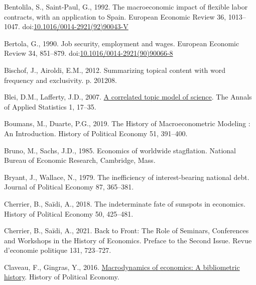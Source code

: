 \documentclass[
  12pt,
  onecolumn]{article}
\newlength{\cslhangindent}
\newlength{\cslentryspacingunit} %
\newenvironment{CSLReferences}[2] %
 {%
  \setlength{\parindent}{0pt}
  \ifodd #1
  \let\oldpar\par
  \def\par{\hangindent=\cslhangindent\oldpar}
  \fi
  \setlength{\parskip}{#2\cslentryspacingunit}
 }%
 {}
\begin{document}
\begin{CSLReferences}{1}{0}
\leavevmode{}%
Bentolila, S., Saint-Paul, G., 1992. The macroeconomic impact of
flexible labor contracts, with an application to {Spain}. European
Economic Review 36, 1013--1047.
doi:\href{https://doi.org/10.1016/0014-2921(92)90043-V}{10.1016/0014-2921(92)90043-V}

\leavevmode{}%
Bertola, G., 1990. Job security, employment and wages. European Economic
Review 34, 851--879.
doi:\href{https://doi.org/10.1016/0014-2921(90)90066-8}{10.1016/0014-2921(90)90066-8}

\leavevmode{}%
Bischof, J., Airoldi, E.M., 2012. Summarizing topical content with word
frequency and exclusivity. p. 201208.

\leavevmode{}%
Blei, D.M., Lafferty, J.D., 2007.
\href{https://www.jstor.org/stable/4537420}{A correlated topic model of
science}. The Annals of Applied Statistics 1, 17--35.

\leavevmode{}%
Boumans, M., Duarte, P.G., 2019. The {History} of {Macroeconometric
Modeling} : {An Introduction}. History of Political Economy 51,
391--400.

\leavevmode{}%
Bruno, M., Sachs, J.D., 1985. Economics of worldwide stagflation.
{National Bureau of Economic Research}, {Cambridge, Mass.}

\leavevmode{}%
Bryant, J., Wallace, N., 1979. The inefficiency of interest-bearing
national debt. Journal of Political Economy 87, 365--381.

\leavevmode{}%
Cherrier, B., Saïdi, A., 2018. The indeterminate fate of sunspots in
economics. History of Political Economy 50, 425--481.

\leavevmode{}%
Cherrier, B., Saïdi, A., 2021. Back to {Front}: {The Role} of
{Seminars}, {Conferences} and {Workshops} in the {History} of
{Economics}. {Preface} to the {Second Issue}. Revue d'economie politique
131, 723--727.

\leavevmode{}%
Claveau, F., Gingras, Y., 2016.
\href{http://hope.dukejournals.org/cgi/content/short/48/4/551?rss=1}{Macrodynamics
of economics: A bibliometric history}. History of Political Economy.


\end{CSLReferences}
\end{document}
